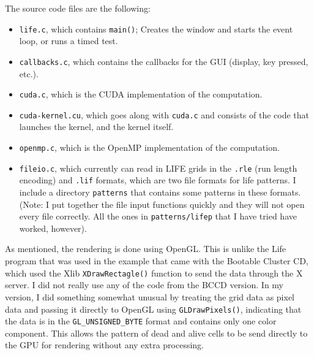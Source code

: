 \documentclass[letterpaper,12pt]{article}
\begin{document}
The source code files are the following:

\begin{itemize}
\item {\tt life.c}, which contains {\tt main()}; Creates the window and starts
the event loop, or runs a timed test.
\item {\tt callbacks.c}, which contains the callbacks for the GUI (display, key
pressed, etc.).
\item {\tt cuda.c}, which is the CUDA implementation of the computation.
\item {\tt cuda-kernel.cu}, which goes along with {\tt cuda.c} and consists of
the code that launches the kernel, and the kernel itself. 
\item {\tt openmp.c}, which is the OpenMP implementation of the computation.
\item {\tt fileio.c}, which currently can read in LIFE grids in the {\tt .rle} (run
length encoding) and {\tt .lif} formats, which are two file formats for life patterns.
I include a directory {\tt patterns} that contains some patterns in these
formats.  (Note: I put together the file input functions quickly and they will
not open every file correctly.  All the ones in {\tt patterns/lifep} that I have
tried have worked, however).
\end{itemize}

As mentioned, the rendering is done using OpenGL.  This is unlike the Life
program that was used in the example that came with the Bootable Cluster CD,
which used the Xlib {\tt XDrawRectagle()} function to send the data through the
X server.  I did not really use any of the code from the BCCD version.  In my
version, I did something somewhat unusual by treating the grid data as pixel
data and passing it directly to OpenGL using {\tt GLDrawPixels()}, indicating
that the data is in the {\tt GL\_UNSIGNED\_BYTE} format and contains only one
color component.  This allows the pattern of dead and alive cells to be send
directly to the GPU for rendering without any extra processing.
\end{document}
